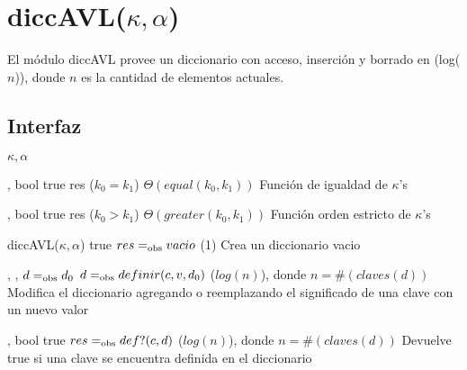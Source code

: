 \section{diccAVL($\kappa, \alpha$)}

El módulo diccAVL provee un diccionario con acceso, inserción y borrado en \bigo(log($n$)), donde $n$ es la cantidad de elementos actuales.

\subsection{Interfaz}

\begin{iparamformales}{$\kappa, \alpha$}

    \funcion{$\bullet = \bullet$} %
        {, } %
        {bool} %
        {true} %
        {res \igobs ($k_0 = k_1$)} %
        {$\Theta(equal(k_0, k_1))$} %
        {} %
        {Función de igualdad de $\kappa$'s} %

    \funcion{$\bullet > \bullet$} %
        {, } %
        {bool} %
        {true} %
        {res \igobs ($k_0 > k_1$)} %
        {$\Theta(greater(k_0, k_1))$} %
        {} %
        {Función orden estricto de $\kappa$'s} %

\end{iparamformales}

\iusa{}

\ioperaciones

{}
{diccAVL($\kappa, \alpha$)}
{true}
{$res =_{\mathrm{obs}} vacio$}
{\bigo(1)}
{}
{Crea un diccionario vacio}

{   ,
    ,
    }
{}
{$d =_{\mathrm{obs}} d_0$}
{$d =_{\mathrm{obs}} definir(c, v, d_0)$}
{\bigo($log(n)$), donde $n = \#(claves(d))$}
{}
{Modifica el diccionario agregando o reemplazando el significado de una clave 
    con un nuevo valor}

{   ,
    }
{bool}
{true}
{$res =_{\mathrm{obs}} def?(c, d)$}
{\bigo($log(n)$), donde $n = \#(claves(d))$}
{}
{Devuelve true si una clave se encuentra definida en el diccionario}

